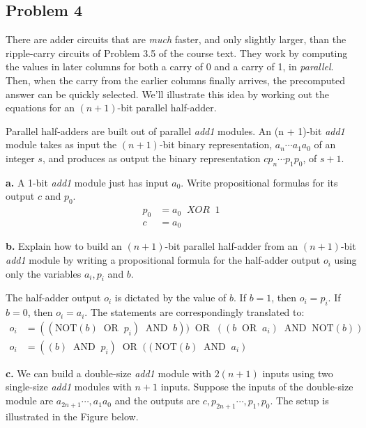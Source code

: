 \documentclass[12pt]{article}
\begin{document}
\subsection*{Problem 4}
\par{There are adder circuits that are \textit{much} faster, and only slightly larger, than the ripple-carry circuits of Problem 3.5 of the course text. They work by computing the values in later columns for both a carry of 0 and a carry of 1, in \textit{parallel}. Then, when the carry from the earlier columns finally arrives, the precomputed answer can be quickly selected. We'll illustrate this idea by working out the equations for an $(n + 1)$-bit parallel half-adder.}
\newline
\par{Parallel half-adders are built out of parallel \textit{add1} modules. An (n + 1)-bit \textit{add1} module takes as input the $(n + 1)$-bit binary representation, $a_n\cdots a_1a_0$ of an integer $s$, and produces as output the binary representation $c p_n\cdots p_1 p_0$, of $s + 1$.}
\newline
\par{\textbf{a.} A 1-bit \textit{add1} module just has input $a_0$. Write propositional formulas for its output $c$ and $p_0$.}
\begin{align*}
p_0 &= a_0\;\;XOR\;\;1 \\
c &= a_0
\end{align*}
\par{\textbf{b.} Explain how to build an $(n + 1)$-bit parallel half-adder from an $(n + 1)$-bit \textit{add1} module by writing a propositional formula for the half-adder output $o_i$ using only the variables $a_i, p_i$ and $b$.}
\newline
\par{The half-adder output $o_i$ is dictated by the value of $b$. If $b = 1$, then $o_i = p_i$. If $b = 0$, then $o_i = a_i$. The statements are correspondingly translated to:}
\begin{align*}
o_i &= ((\text{NOT}(b)\;\;\text{OR}\;\;p_i)\;\;\text{AND}\;\;b))\;\;\text{OR}\;\;((b\;\;\text{OR}\;\;a_i)\;\;\text{AND}\;\;\text{NOT}(b)) \\
o_i &= ((b)\;\;\text{AND}\;\;p_i)\;\;\text{OR}\;\;((\text{NOT}(b)\;\;\text{AND}\;\;a_i)
\end{align*}
\par{\textbf{c.} We can build a double-size \textit{add1} module with $2(n + 1)$ inputs using two single-size \textit{add1} modules with $n + 1$ inputs. Suppose the inputs of the double-size module are $a_{2n + 1}\cdots,a_1a_0$ and the outputs are $c,p_{2n + 1}\cdots,p_1,p_0$. The setup is illustrated in the Figure below.}
\end{document}
